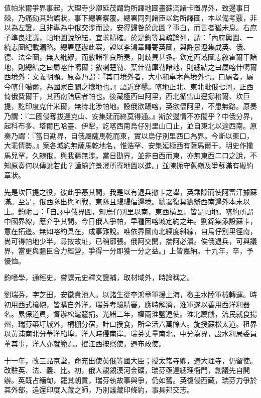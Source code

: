 \begin{pinyinscope}
值帕米爾爭界事起，大理寺少卿延茂謂鈞所譯地圖畫蘇滿諸卡置界外，致邊事日棘，乃痛劾其貽誤狀，事下總署察覆。總署同列諸臣以鈞所譯圖，本以備考覈，非以為左證，且非專為中俄交涉而設，安得歸咎於此圖？事白，而言者猶未息。右庶子準良建議，帕地圖說紛紜，宜求精確。於是鈞等具疏論列，謂：「內府輿圖、一統志圖紀載漏略。總署歷辦此案，證以李鴻章譯寄英圖，與許景澄集成英、俄、德、法全圖，無大紕繆，而覈諸準良所奏，則歧異甚多。欽定西域圖志敘霍爾干諸地，則總結之曰屬喀什噶爾；敘喇楚勒、葉什勒庫勒諸地，則總結之曰屬喀什噶爾西境外：文義明顯。原奏乃謂：『其曰境外者，大小和卓木舊境外也。曰屬者，屬今喀什噶爾，為國家自闢之壤地也。』語近穿鑿。喀地正北、東北毗俄七河，正西倚俄費爾干，其西南錯居者帕也。後藏極西曰阿里，西北循雪山逕挪格爾、坎巨提，訖印度克什米爾，無待北涉帕地。設俄欲躡喀，英欲偪阿里，不患無路。原奏乃謂：『二國侵奪拔達克山、安集延而終莫得通。』斯於邊情不亦闇乎？中俄分界，起科布多、塔爾巴哈臺、伊犁，訖喀西南烏仔別里山口止，並自東北以達西南。原奏乃謂：『當日勘界，自俄屬薩馬乾而東，實以烏仔別里西口為界。今斷以東口，大乖情勢。』案各城約無薩馬乾地名，惟浩罕、安集延極西有薩馬爾干，明史作撒馬兒罕，久隸俄，與我疆無涉。當日勘界，並非自西而東，亦無東西二口之說，不知原奏何以傳訛若此？謹繪許景澄所寄地圖以進。」並陳扼守蔥嶺及爭蘇滿有礙約章狀。

先是坎巨提之役，彼此爭惎其間，我是以有退兵撤卡之舉，英乘隙而使阿富汗據蘇滿。至是，俄西隊出與阿戰，東隊且駸駸偪邊境。總署復具籌辦西南邊外本末以上。鈞附言：「自譯中俄界圖，知烏仔別里以南，東西橫亙，皆是帕地。喀約所謂中國界線，應介乎其間。今日俄人爭帕，早種因喀城定約之年。劉錦棠添設蘇卡，意在拓邊。無如喀約具在，成事難說。唯依界圖南北經度斜線，自烏仔別里徑南，尚可得帕地少半，尋按故址，已稍廓張。俄阿交閧，揣阿必潰。俟俄退兵，可與議界，當更與疆臣合力經營，爭得一分即獲一分之益。」上皆嘉納。十九年，卒，予優恤。

鈞嗜學，通經史，嘗譔元史釋文證補，取材域外，時論稱之。

劉瑞芬，字芝田，安徽貴池人。以諸生從李鴻章軍援上海，檄主水陸軍械轉運。時初用西式槍砲，皆購自外洋，瑞芬考驗精審，應時解濟，淮軍遂以善用西洋利器名。累保道員，督辦松滬釐捐。光緒二年，權兩淮鹽運使。淮北薦饑，流民就食揚州，瑞芬築圩城外，構棚分宿，計口授食，所全活六萬餘人。旋授蘇松太道。租界以黃浦南北分華洋船埠，洋人時侵南岸。瑞芬丈量南北，中分為界，設水利局委員董其事，洋人亦就範焉。擢江西按察使，遷布政使。

十一年，改三品京堂，命充出使英俄等國大臣；授太常寺卿，遷大理寺，仍留使。改駐英、法、義、比。初，俄人覬覦漠河金礦，瑞芬亟達總理衙門，創議先自開辦。英既占緬甸，罷其朝貢，瑞芬執故事與爭，仍如舊。英復侵西藏，瑞芬力爭於其外部，追還印度入藏之師，乃別議藏印條約，事具邦交志。


\end{pinyinscope}
